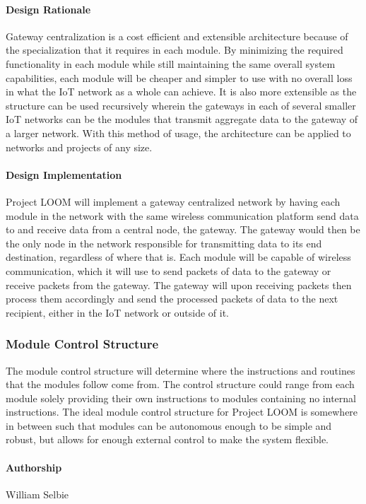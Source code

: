 \documentclass[onecolumn, draftclsnofoot,10pt, compsoc]{IEEEtran}
\begin{document}
\paragraph{Design Rationale}
    Gateway centralization is a cost efficient and extensible architecture because of the specialization that it requires in each module. By minimizing the required functionality in each module while still maintaining the same overall system capabilities, each module will be cheaper and simpler to use with no overall loss in what the IoT network as a whole can achieve. It is also more extensible as the structure can be used recursively wherein the gateways in each of several smaller IoT networks can be the modules that transmit aggregate data to the gateway of a larger network. With this method of usage, the architecture can be applied to networks and projects of any size.

\paragraph{Design Implementation}
    Project LOOM will implement a gateway centralized network by having each module in the network with the same wireless communication platform send data to and receive data from a central node, the gateway. The gateway would then be the only node in the network responsible for transmitting data to its end destination, regardless of where that is. Each module will be capable of wireless communication, which it will use to send packets of data to the gateway or receive packets from the gateway. The gateway will upon receiving packets then process them accordingly and send the processed packets of data to the next recipient, either in the IoT network or outside of it. 

\subsubsection{Module Control Structure}
    The module control structure will determine where the instructions and routines that the modules follow come from. The control structure could range from each module solely providing their own instructions to modules containing no internal instructions. The ideal module control structure for Project LOOM is somewhere in between such that modules can be autonomous enough to be simple and robust, but allows for enough external control to make the system flexible.

\paragraph{Authorship}
    William Selbie
\end{document}
